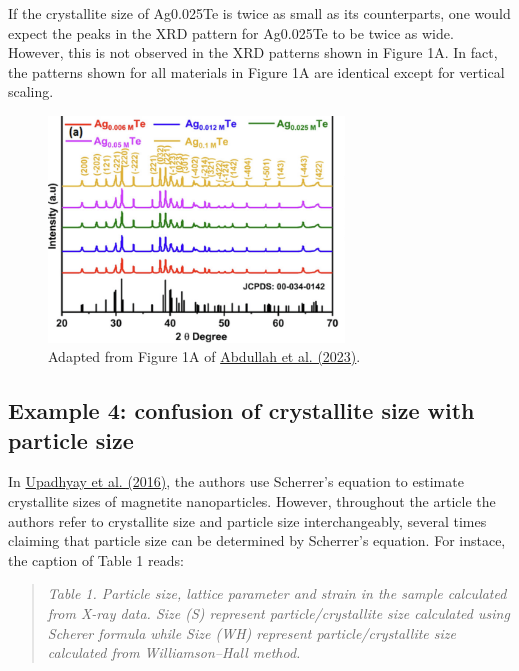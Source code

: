 \documentclass[letterpaper, 12pt]{article}
\begin{document}
If the crystallite size of Ag0.025Te is twice as small as its counterparts, one would expect the peaks in the XRD pattern for Ag0.025Te to be twice as wide. However, this is not observed in the XRD patterns shown in Figure 1A. In fact, the patterns shown for all materials in Figure 1A are identical except for vertical scaling.

\begin{figure}[h!tbp]
\centering
    \includegraphics[width=0.7\textwidth]{img/xrd/xrd_spectra_abdullah.png}
    \caption*{ Adapted from Figure 1A of \href{https://doi.org/10.1021/acs.energyfuels.2c03279}{Abdullah et al. (2023)}.}
\end{figure}

\subsection*{Example 4: confusion of crystallite size with particle size}

In \href{https://doi.org/10.1016/j.jallcom.2016.03.279}{Upadhyay et al. (2016)}, the authors use Scherrer's equation to estimate crystallite sizes of magnetite nanoparticles. However, throughout the article the authors refer to crystallite size and particle size interchangeably, several times claiming that particle size can be determined by Scherrer's equation. For instace, the caption of Table 1 reads:

\begin{quote}
    \textit{Table 1. Particle size, lattice parameter and strain in the sample calculated from X-ray data. Size (S) represent particle/crystallite size calculated using Scherer formula while Size (WH) represent particle/crystallite size calculated from Williamson–Hall method.}
\end{quote}
\end{document}
